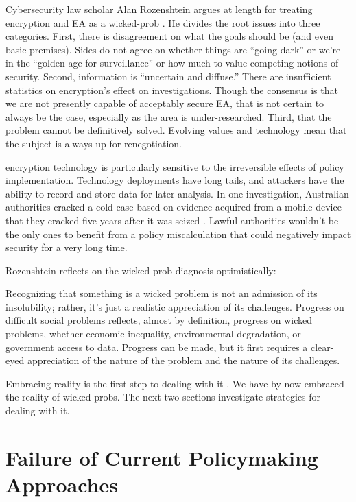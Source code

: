 Cybersecurity law scholar Alan Rozenshtein argues at length for treating \ac{encryption} and \ac{EA} as a
\ac{wicked-prob} \cite{rozenshtein_wicked_2018}. He divides the root issues into three categories. First, there is
disagreement on what the goals should be (and even basic premises). Sides do not agree on whether things are ``going
dark'' or we're in the ``golden age for surveillance'' or how much to value competing notions of security. Second,
information is ``uncertain and diffuse.'' There are insufficient statistics on encryption's effect on investigations.
Though the consensus is that we are not presently capable of acceptably secure \ac{EA}, that is not certain to always be
the case, especially as the area is under-researched. Third, that the problem cannot be definitively solved. Evolving
values and technology mean that the subject is always up for renegotiation.

\Ac{encryption} technology is particularly sensitive to the irreversible effects of policy implementation. Technology
deployments have long tails, and attackers have the ability to record and store data for later analysis. In one
investigation, Australian authorities cracked a cold case based on evidence acquired from a mobile device that they
cracked five years after it was seized \cite{evans_arrests_2020}. Lawful authorities wouldn't be the only ones to
benefit from a policy miscalculation that could negatively impact security for a very long time.

Rozenshtein reflects on the \ac{wicked-prob} diagnosis optimistically:

\begin{displayquote}
Recognizing that something is a wicked problem is not an admission of its insolubility; rather, it’s just a realistic
appreciation of its challenges. Progress on difficult social problems reflects, almost by definition, progress on wicked
problems, whether economic inequality, environmental degradation, or government access to data. Progress can be made,
but it first requires a clear-eyed appreciation of the nature of the problem and the nature of its challenges.
\cite{rozenshtein_wicked_2018}
\end{displayquote}

Embracing reality is the first step to dealing with it \cite{baker_2019}. We have by now embraced the reality of
\acp{wicked-prob}. The next two sections investigate strategies for dealing with it.


\section{Failure of Current Policymaking Approaches}

